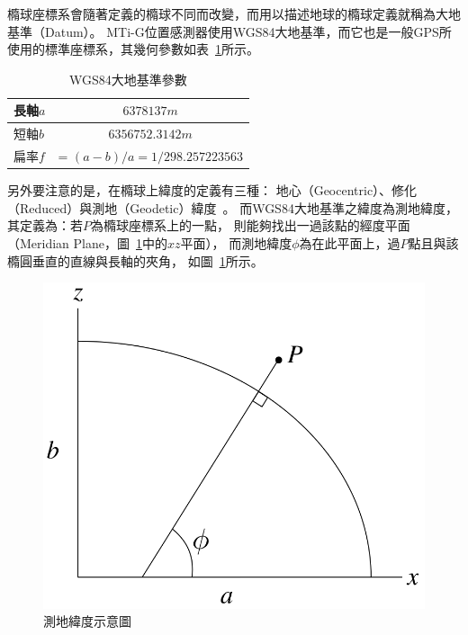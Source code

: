 橢球座標系會隨著定義的橢球不同而改變，而用以描述地球的橢球定義就稱為大地基準（Datum）。
MTi-G位置感測器使用WGS84大地基準，而它也是一般GPS所使用的標準座標系，其幾何參數如表~\ref{t:wgs84}所示。
\begin{table}[h!]
	\centering
	\caption{WGS84大地基準參數}
	\label{t:wgs84}
	\begin{tabular}{ | l | c | }
		\hline
		長軸$a$ & $6378137m$ \\ \hline
		短軸$b$ & $6356752.3142m$ \\ \hline
		扁率$f$	& = $(a-b) / a = 1/298.257223563$ \\
		\hline
	\end{tabular}
\end{table}

另外要注意的是，在橢球上緯度的定義有三種：
地心（Geocentric）、修化（Reduced）與測地（Geodetic）緯度~\cite{Jekeli:2006:GRSinGeodesy}。
而WGS84大地基準之緯度為測地緯度，其定義為：若$P$為橢球座標系上的一點，
則能夠找出一過該點的經度平面（Meridian Plane，圖~\ref{f:geodetic_latitude}中的$xz$平面），
而測地緯度$\phi$為在此平面上，過$P$點且與該橢圓垂直的直線與長軸的夾角，
如圖~\ref{f:geodetic_latitude}所示。
\begin{figure}[h!]
	\centering
	\includegraphics[width=.5\textwidth]{figures/algorithm/geodetic_latitude}
	\caption{測地緯度示意圖}
	\label{f:geodetic_latitude}
\end{figure}


